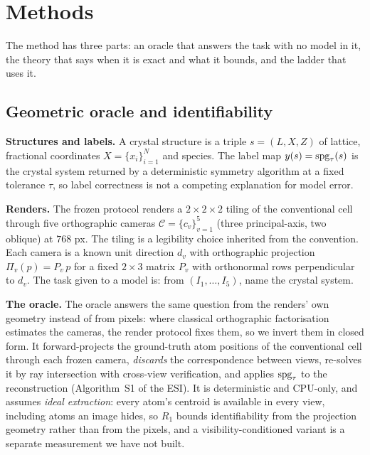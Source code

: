 \section{Methods} \label{sec:method} The method has three parts: an oracle that answers the task
with no model in it, the theory that says when it is exact and what it bounds, and the ladder that uses it.

\subsection{Geometric oracle and identifiability}
\label{sec:oracle}

\textbf{Structures and labels.} A crystal structure is a triple $s = (L, X, Z)$ of lattice, fractional
coordinates $X = \{x_i\}_{i=1}^{N}$ and species. The label map $y(s) = \mathrm{spg}_\tau(s)$ is the crystal system returned
by a deterministic symmetry algorithm \citep[spglib,][]{spglib2024} at a fixed tolerance $\tau$, so label
correctness is not a competing explanation for model error.

\textbf{Renders.} The frozen protocol renders a $2\times2\times2$ tiling of the conventional cell through five
orthographic cameras $\mathcal{C} = \{c_v\}_{v=1}^{5}$ (three principal-axis, two oblique) at $768$ px. The
tiling is a legibility choice inherited from the convention. Each camera is a known unit direction $d_v$ with
orthographic projection $\Pi_v(p) = P_v\, p$ for a fixed $2\times3$ matrix $P_v$ with orthonormal rows
perpendicular to $d_v$. The task given to a model is: from $(I_1,\dots,I_5)$, name the crystal system.

\textbf{The oracle.} The oracle answers the same question from the renders' own geometry instead of from
pixels: where classical orthographic factorisation estimates the cameras, the render protocol fixes them, so
we invert them in closed form. It forward-projects the ground-truth atom positions of the conventional cell
through each frozen camera, \emph{discards} the correspondence between views, re-solves it by ray intersection
with cross-view verification, and applies $\mathrm{spg}_\tau$ to the reconstruction (Algorithm~S1 of the ESI\dag{}). It is
deterministic and CPU-only, and assumes \emph{ideal extraction}: every atom's centroid is available in every view, including
atoms an image hides, so $R_1$ bounds identifiability from the projection geometry rather than from the
pixels, and a visibility-conditioned variant is a separate measurement we have not built.

